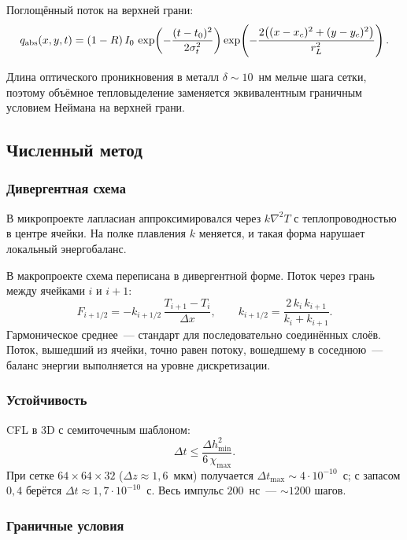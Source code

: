 Поглощённый поток на верхней грани:
\begin{equation}
  q_{\rm abs}(x, y, t) = (1 - R)\, I_0\,
    \exp\!\left(-\frac{(t - t_0)^2}{2\sigma_t^2}\right)
    \exp\!\left(-\frac{2\bigl((x-x_c)^2+(y-y_c)^2\bigr)}{r_L^2}\right).
\end{equation}

Длина оптического проникновения в металл $\delta \sim 10$~нм мельче
шага сетки, поэтому объёмное тепловыделение заменяется эквивалентным
граничным условием Неймана на верхней грани.

\subsection{Численный метод}

\subsubsection{Дивергентная схема}

В микропроекте лапласиан аппроксимировался через $k\nabla^2 T$
с теплопроводностью в центре ячейки. На полке плавления $k$ меняется,
и такая форма нарушает локальный энергобаланс.

В макропроекте схема переписана в дивергентной форме. Поток через грань
между ячейками $i$ и $i+1$:
\begin{equation}
  F_{i+1/2} = -k_{i+1/2}\, \frac{T_{i+1} - T_i}{\Delta x},
  \qquad
  k_{i+1/2} = \frac{2\, k_i\, k_{i+1}}{k_i + k_{i+1}}.
\end{equation}
Гармоническое среднее~--- стандарт для последовательно соединённых
слоёв. Поток, вышедший из ячейки, точно равен потоку, вошедшему в
соседнюю~--- баланс энергии выполняется на уровне дискретизации.

\subsubsection{Устойчивость}

CFL в 3D с семиточечным шаблоном:
\begin{equation}
  \Delta t \le \frac{\Delta h_{\min}^2}{6\,\chi_{\max}}.
\end{equation}
При сетке $64 \times 64 \times 32$ ($\Delta z \approx 1{,}6$~мкм)
получается $\Delta t_{\max} \sim 4 \cdot 10^{-10}$~с; с запасом $0{,}4$
берётся $\Delta t \approx 1{,}7 \cdot 10^{-10}$~с. Весь импульс
$200$~нс~--- $\sim 1200$ шагов.

\subsubsection{Граничные условия}

